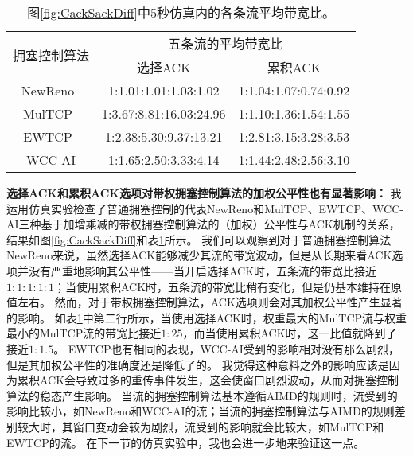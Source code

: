 \documentclass[winfonts]{njuthesis}
\begin{document}
\begin{table}[h]
	\caption{图\ref{fig:CackSackDiff}中5秒仿真内的各条流平均带宽比。}
	\label{tab:CackSackDiff}
	\centering
	\begin{tabular}{c|cc}
		\hline
		\multirow{2}{*}{拥塞控制算法} & \multicolumn{2}{c}{五条流的平均带宽比} \\
		\cline{2-3} & 选择ACK & 累积ACK \\
		\hline
		NewReno~\cite{Henderson2012NewReno} & 1:1.01:1.01:1.03:1.02 & 1:1.04:1.07:0.74:0.92 \\
		MulTCP~\cite{crowcroft1998differentiated} & 1:3.67:8.81:16.03:24.96 & 1:1.10:1.36:1.54:1.55 \\
		EWTCP~\cite{Honda2009EWTCP} & 1:2.38:5.30:9.37:13.21 & 1:2.81:3.15:3.28:3.53\\
		WCC-AI & 1:1.65:2.50:3.33:4.14 & 1:1.44:2.48:2.56:3.10\\
		\hline
	\end{tabular}
\end{table}

\textbf{选择ACK和累积ACK选项对带权拥塞控制算法的加权公平性也有显著影响：}
我运用仿真实验检查了普通拥塞控制的代表NewReno和MulTCP、EWTCP、WCC-AI三种基于加增乘减的带权拥塞控制算法的（加权）公平性与ACK机制的关系，结果如图\ref{fig:CackSackDiff}和表\ref{tab:CackSackDiff}所示。
我们可以观察到对于普通拥塞控制算法NewReno来说，虽然选择ACK能够减少其流的带宽波动，但是从长期来看ACK选项并没有严重地影响其公平性——当开启选择ACK时，五条流的带宽比接近$1:1:1:1:1$；当使用累积ACK时，五条流的带宽比稍有变化，但是仍基本维持在原值左右。
然而，对于带权拥塞控制算法，ACK选项则会对其加权公平性产生显著的影响。
如表\ref{tab:CackSackDiff}中第二行所示，当使用选择ACK时，权重最大的MulTCP流与权重最小的MulTCP流的带宽比接近$1:25$，而当使用累积ACK时，这一比值就降到了接近$1:1.5$。
EWTCP也有相同的表现，WCC-AI受到的影响相对没有那么剧烈，但是其加权公平性的准确度还是降低了的。
我觉得这种意料之外的影响应该是因为累积ACK会导致过多的重传事件发生\cite{Mathis1996SACK}，这会使窗口剧烈波动，从而对拥塞控制算法的稳态产生影响。
当流的拥塞控制算法基本遵循AIMD的规则时，流受到的影响比较小，如NewReno和WCC-AI的流；当流的拥塞控制算法与AIMD的规则差别较大时，其窗口变动会较为剧烈，流受到的影响就会比较大，如MulTCP和EWTCP的流。
在下一节的仿真实验中，我也会进一步地来验证这一点。
\end{document}
